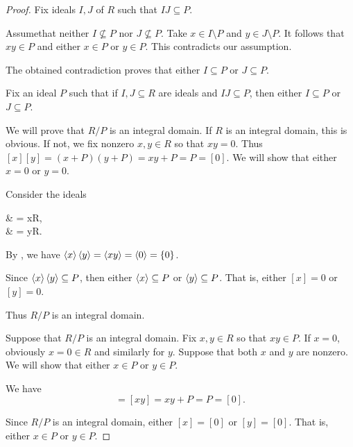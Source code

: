 \begin{proof}
   Fix ideals \( I, J \) of \( R \) such that \( IJ \subseteq P \).

  Assume\LEM that neither \( I \not\subseteq P \) nor \( J \not\subseteq P \). Take \( x \in I \setminus P \) and \( y \in J \setminus P \). It follows that \( xy \in P \) and either \( x \in P \) or \( y \in P \). This contradicts our assumption.

  The obtained contradiction proves that either \( I \subseteq P \) or \( J \subseteq P \).

   Fix an ideal \( P \) such that if \( I, J \subseteq R \) are ideals and \( IJ \subseteq P \), then either \( I \subseteq P \) or \( J \subseteq P \).

  We will prove that \( R / P \) is an integral domain. If \( R \) is an integral domain, this is obvious. If not, we fix nonzero \( x, y \in R \) so that \( xy = 0 \). Thus \( [x][y] = (x + P)(y + P) = xy + P = P = [0] \). We will show that either \( x = 0 \) or \( y = 0 \).

  Consider the ideals
  \begin{BreakableAlign*}
     & = xR, \\
     & = yR.
  \end{BreakableAlign*}

  By , we have \( \left\langle x \right\rangle \left\langle y \right\rangle = \left\langle xy \right\rangle = \left\langle 0 \right\rangle = \{ 0 \} \).

  Since \( \left\langle x \right\rangle \left\langle y \right\rangle \subseteq P \), then either \( \left\langle x \right\rangle \subseteq P \) or \( \left\langle y \right\rangle \subseteq P \). That is, either \( [x] = 0 \) or \( [y] = 0 \).

  Thus \( R / P \) is an integral domain.

   Suppose that \( R / P \) is an integral domain. Fix \( x, y \in R \) so that \( xy \in P \). If \( x = 0 \), obviously \( x = 0 \in R \) and similarly for \( y \). Suppose that both \( x \) and \( y \) are nonzero. We will show that either \( x \in P \) or \( y \in P \).

  We have
  \begin{equation*}
    [x][y] = [xy] = xy + P = P = [0].
  \end{equation*}

  Since \( R / P \) is an integral domain, either \( [x] = [0] \) or \( [y] = [0] \). That is, either \( x \in P \) or \( y \in P \).
\end{proof}

